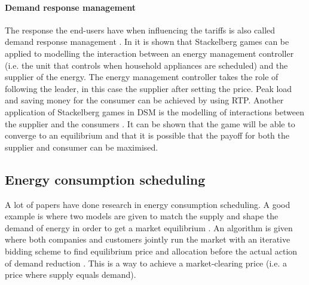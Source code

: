 \paragraph{Demand response management}
The response the end-users have when influencing the tariffs is also called demand response management \cite{MaharjanZhuZhangEtAl2013}.
In \cite{ChenKishoreSnyder2011} it is shown that Stackelberg games can be applied to modelling the interaction between an energy management controller (i.e. the unit that controls when household appliances are scheduled) and the supplier of the energy. The energy management controller takes the role of following the leader, in this case the supplier after setting the price. Peak load and saving money for the consumer can be achieved by using RTP. Another application of Stackelberg games in DSM is the modelling of interactions between the supplier and the consumers \cite{MaharjanZhuZhangEtAl2013}. It can be shown that the game will be able to converge to an equilibrium and that it is possible that the payoff for both the supplier and consumer can be maximised. 

\subsection{Energy consumption scheduling}
A lot of papers have done research in energy consumption scheduling. A good example is where two models are given to match the supply and shape the demand of energy in order to get a market equilibrium \cite{ChenLiLowEtAl2010}. An algorithm is given where both companies and customers jointly run the market with an iterative bidding scheme to find equilibrium price and allocation before the actual action of demand reduction \cite{ChenLiLowEtAl2010}. This is a way to achieve a market-clearing price (i.e. a price where supply equals demand).


